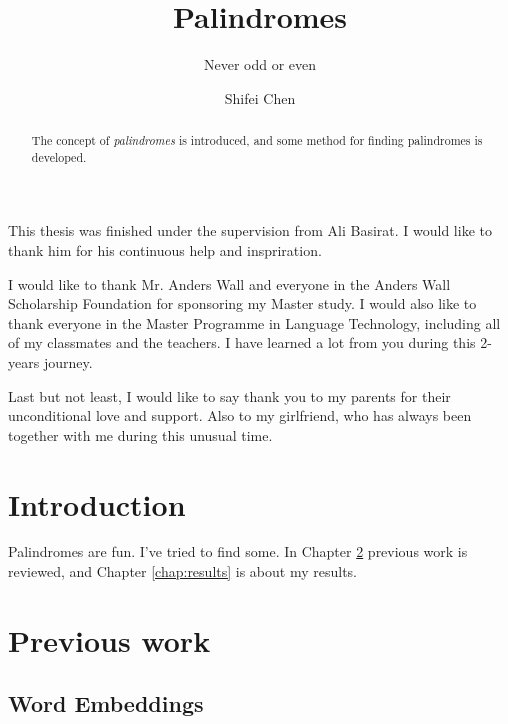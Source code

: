 \documentclass[thesis,fonts=libertine]{cluu}
\begin{document}
\author{Shifei Chen}
\title{Palindromes}
\subtitle{Never odd or even}

\maketitle

\begin{abstract}
  The concept of \emph{palindromes} is introduced, and some method for
  finding palindromes is developed.
\end{abstract}

\tableofcontents


This thesis was finished under the supervision from Ali Basirat. I would like 
to thank him for his continuous help and inspriration.

I would like to thank Mr. Anders Wall and everyone in the Anders Wall Scholarship Foundation for sponsoring my Master study. I would also like to thank everyone in the Master Programme in Language Technology, including all of my classmates and the teachers. I have learned a lot from you during this 2-years journey.

Last but not least, I would like to say thank you to my parents for their unconditional love and support. Also to my girlfriend, who has always been together with me during this unusual time.


\chapter{Introduction}

Palindromes are fun. I've tried to find some.
In Chapter \ref{chap:prev} previous work is reviewed, and
Chapter \ref{chap:results} is about my results.

\chapter{Previous work}
\label{chap:prev}

\section{Word Embeddings}
\end{document}
